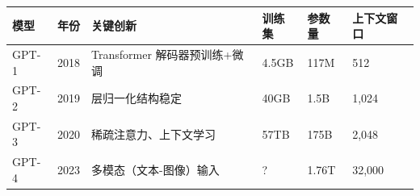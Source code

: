 \begin{table}[htbp]
    \centering
    \footnotesize
    \label{tab:gpt_series}
    \begin{tabular}{l l l l l l}
    \toprule
    \textbf{模型} & \textbf{年份} & \textbf{关键创新} & \textbf{训练集} & \textbf{参数量} & \textbf{上下文窗口} \\
    \midrule
    GPT-1\citep{radford2018improving} & 2018 & Transformer 解码器预训练+微调 & 4.5GB & 117M & 512 \\
    GPT-2\citep{radford2019language} & 2019 & 层归一化结构稳定 & 40GB & 1.5B & 1,024 \\
    GPT-3\citep{brown2020language} & 2020 & 稀疏注意力、上下文学习 & 57TB & 175B & 2,048 \\
    GPT-4\citep{achiam2023gpt} & 2023 & 多模态（文本-图像）输入 & ? & 1.76T & 32,000 \\
    \bottomrule
    \end{tabular}
\end{table}